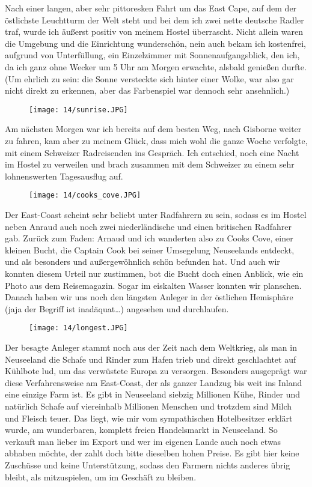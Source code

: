 Nach einer langen, aber sehr pittoresken Fahrt um das East Cape, auf dem
der östlichste Leuchtturm der Welt steht und bei dem ich zwei nette
deutsche Radler traf, wurde ich äußerst positiv von meinem Hostel
überrascht. Nicht allein waren die Umgebung und die Einrichtung
wunderschön, nein auch bekam ich kostenfrei, aufgrund von Unterfüllung,
ein Einzelzimmer mit Sonnenaufgangsblick, den ich, da ich ganz ohne
Wecker um 5 Uhr am Morgen erwachte, alsbald genießen durfte. (Um ehrlich
zu sein: die Sonne versteckte sich hinter einer Wolke, war also gar
nicht direkt zu erkennen, aber das Farbenspiel war dennoch sehr
ansehnlich.)
\begin{figure}[h]
  \centering
  \texttt{[image: 14/sunrise.JPG]}
\end{figure}

Am nächsten Morgen war ich bereits auf dem besten Weg, nach
Gisborne weiter zu fahren, kam aber zu meinem Glück, dass mich wohl die
ganze Woche verfolgte, mit einem Schweizer Radreisenden ins Gespräch.
Ich entschied, noch eine Nacht im Hostel zu verweilen und brach zusammen
mit dem Schweizer zu einem sehr lohnenswerten Tagesausflug auf.
\begin{figure}[h]
  \centering
  \texttt{[image: 14/cooks\_cove.JPG]}
\end{figure}

Der East-Coast scheint sehr beliebt unter Radfahrern zu sein, sodass
es im Hostel neben Anraud auch noch zwei niederländische und einen
britischen Radfahrer gab. Zurück zum Faden: Arnaud und ich wanderten
also zu Cooks Cove, einer kleinen Bucht, die Captain Cook bei seiner
Umsegelung Neuseelands entdeckt, und als besonders und außergewöhnlich
schön befunden hat. Und auch wir konnten diesem Urteil nur zustimmen,
bot die Bucht doch einen Anblick, wie ein Photo aus dem
Reisemagazin. Sogar im eiskalten Wasser konnten wir planschen. Danach
haben wir uns noch den längsten Anleger in der östlichen Hemisphäre
(jaja der Begriff ist inadäquat\ldots) angesehen und durchlaufen.
\begin{figure}[h]
  \centering
  \texttt{[image: 14/longest.JPG]}
\end{figure}

Der besagte Anleger stammt noch aus der Zeit nach dem Weltkrieg, als
man in Neuseeland die Schafe und Rinder zum Hafen trieb und direkt
geschlachtet auf Kühlbote lud, um das verwüstete Europa zu
versorgen. Besonders ausgeprägt war diese Verfahrensweise am
East-Coast, der als ganzer Landzug bis weit ins Inland eine einzige
Farm ist. Es gibt in Neuseeland siebzig Millionen Kühe, Rinder und
natürlich Schafe auf viereinhalb Millionen Menschen und trotzdem sind
Milch und Fleisch teuer. Das liegt, wie mir vom sympathischen
Hotelbesitzer erklärt wurde, am wunderbaren, komplett freien
Handelsmarkt in Neuseeland. So verkauft man lieber im Export und wer
im eigenen Lande auch noch etwas abhaben möchte, der zahlt doch bitte
dieselben hohen Preise. Es gibt hier keine Zuschüsse und keine
Unterstützung, sodass den Farmern nichts anderes übrig bleibt, als
mitzuspielen, um im Geschäft zu bleiben.

